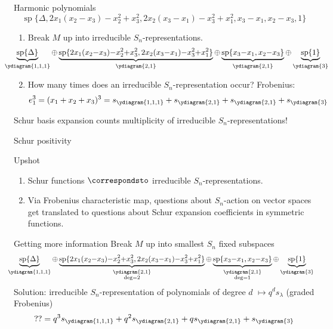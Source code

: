\documentclass{beamer}
\renewcommand{\Span}{\operatorname{sp}}
\begin{document}
\begin{frame}{Harmonic polynomials}
\[
\Span\{\Delta, 2x_1(x_2-x_3)-x_2^2+x_3^2,
            2x_2(x_3-x_1)-x_3^2+x_1^2, 
       x_3-x_1, x_2-x_3,1\}
  \]\pause 
  \begin{enumerate}
\item Break \(M\) up into irreducible \(S_n\)-representations. \pause
  \[
    \hspace{-2.9em}
    \scalebox{0.95}{\(
      \underbrace{\Span\{\Delta\}}_{\ydiagram{1,1,1}} {\oplus} \underbrace{\Span\{2x_1(x_2{-}x_3){-}x_2^2{+}x_3^2,
        2x_2(x_3{-}x_1){-}x_3^2{+}x_1^2\}}_{\ydiagram{2,1}} {\oplus}
      \underbrace{\Span\{x_3{-}x_1, x_2{-}x_3\}}_{\ydiagram{2,1}} {\oplus} \underbrace{\Span\{1\}}_{\ydiagram{3}}\)}
  \]\pause
  \item How many times does an irreducible \(S_n\)-representation occur? \pause
    Frobenius: \pause
    \[
      e_1^3 = (x_1+x_2+x_3)^3 = s_{\ydiagram{1,1,1}} + s_{\ydiagram{2,1}} +
      s_{\ydiagram{2,1}} + s_{\ydiagram{3}}
    \]
  \end{enumerate}
  \pause
  Schur basis expansion counts multiplicity of irreducible \(S_n\)-representations!
\end{frame}
\begin{frame}{Schur positivity}
  \begin{block}{Upshot}
    \begin{enumerate}
      \pause
    \item Schur functions \(\correspondsto\) irreducible \(S_n\)-representations.\pause
    \item Via Frobenius characteristic map, questions about
      \(S_n\)-action on vector spaces get translated to questions
      about Schur expansion coefficients in symmetric functions.
    \end{enumerate}
  \end{block}
\end{frame}
\begin{frame}{Getting more information}
  \pause
  Break \(M\) up into smallest \(S_n\) fixed subspaces 
  \[
    \hspace{-0.75em}
    \scalebox{0.95}{\(
      \underbrace{\Span\{\Delta\}}_{\ydiagram{1,1,1}} {\oplus} \underbrace{\Span\{2x_1(x_2{-}x_3){-}x_2^2{+}x_3^2,
        2x_2(x_3{-}x_1){-}x_3^2{+}x_1^2\}}_{\substack{\ydiagram{2,1}\\\deg
        = 2}} {\oplus}
      \underbrace{\Span\{x_3{-}x_1, x_2{-}x_3\}}_{\substack{\ydiagram{2,1}\\\deg=1}} {\oplus} \underbrace{\Span\{1\}}_{\ydiagram{3}}\)}
  \]
  \pause
  Solution: irreducible \(S_n\)-representation of polynomials of degree \(d\) \(\mapsto q^d
  s_\lambda\) (graded Frobenius)\[
    ?? = q^3 s_{\ydiagram{1,1,1}} + q^2 s_{\ydiagram{2,1}} + q
    s_{\ydiagram{2,1}} + s_{\ydiagram{3}}
  \]\pause
\end{frame}
\end{document}
